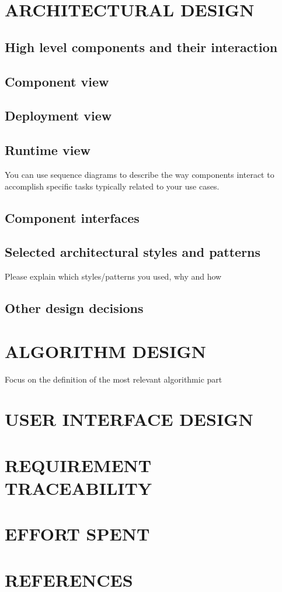\documentclass{article}
\begin{document}
	\section{ARCHITECTURAL DESIGN}
	
	\subsection{High level components and their interaction}
	\subsection{Component view}
	\subsection{Deployment view}
	\subsection{Runtime view}
	You can use sequence diagrams to describe the way components interact to accomplish specific tasks typically related to your use cases.
	\subsection{Component interfaces}
	\subsection{Selected architectural styles and patterns}
	Please explain which styles/patterns you used, why and how
	\subsection{Other design decisions}
	\newpage
	\section{ALGORITHM DESIGN}
	Focus on the definition of the most relevant algorithmic part
	\newpage
	\section{USER INTERFACE DESIGN}
	\newpage
	\section{REQUIREMENT TRACEABILITY}
	\newpage
	\section{EFFORT SPENT}
	\newpage
	\section{REFERENCES}
\end{document}
